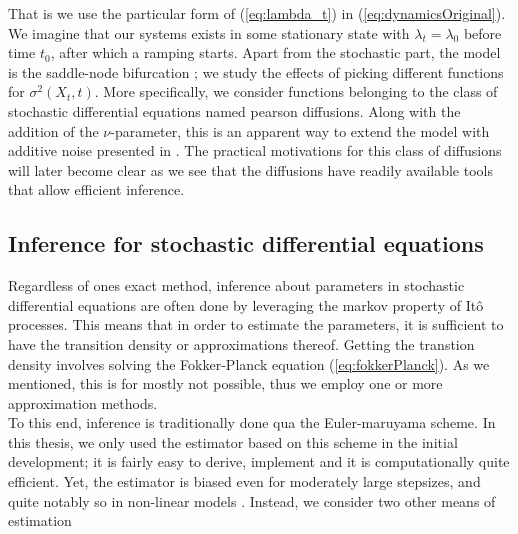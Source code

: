 That is we use the particular form of (\ref{eq:lambda_t}) in (\ref{eq:dynamicsOriginal}). We imagine that our systems exists in some stationary state with $\lambda_t = \lambda_0$ before time $t_0$, after which a ramping starts. Apart from the stochastic part, the model is the saddle-node bifurcation \cite{Strogatz2019_gv}; we study the effects of picking different functions for $\sigma^2(X_t, t)$. More specifically, we consider functions belonging to the class of stochastic differential equations named pearson diffusions. Along with the addition of the $\nu$-parameter, this is an apparent way to extend the model with additive noise presented in \cite[equation (1)]{Ditlevsen2023}. The practical motivations for this class of diffusions will later become clear as we see that the diffusions have readily available tools that allow efficient inference.
\subsection{Inference for stochastic differential equations}
Regardless of ones exact method, inference about parameters in stochastic differential equations are often done by leveraging the markov property of Itô processes. This means that in order to estimate the parameters, it is sufficient to have the transition density or approximations thereof. Getting the transtion density involves solving the Fokker-Planck equation (\ref{eq:fokkerPlanck}). As we mentioned, this is for mostly not possible, thus we employ one or more approximation methods.\\
To this end, inference is traditionally done qua the Euler-maruyama scheme. In this thesis, we only used the estimator based on this scheme in the initial development; it is fairly easy to derive, implement and it is computationally quite efficient. Yet, the estimator is biased even for moderately large stepsizes, and quite notably so in non-linear models \cite{SplittingSchemes}. Instead, we consider two other means of estimation 
